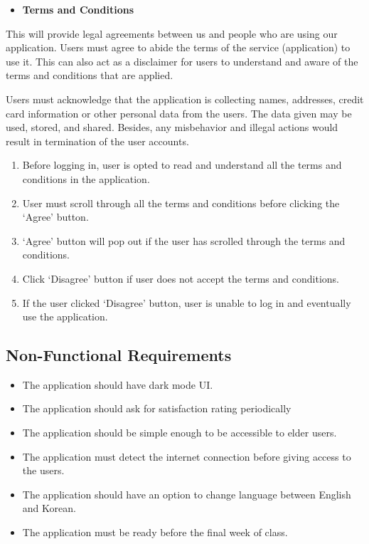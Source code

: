 \documentclass[conference]{IEEEtran}
\begin{document}
\begin{itemize}
\item \textbf{Terms and Conditions}
\end{itemize}
\par This will provide legal agreements between us and people who are using our application. Users must agree to abide the terms of the service (application) to use it. This can also act as a disclaimer for users to understand and aware of the terms and conditions that are applied.
\par Users must acknowledge that the application is collecting names, addresses, credit card information or other personal data from the users. The data given may be used, stored, and shared. Besides, any misbehavior and illegal actions would result in termination of the user accounts. 
\begin{enumerate}
\item  Before logging in, user is opted to read and understand all the terms and conditions in the application.
\item  User must scroll through all the terms and conditions before clicking the ‘Agree’ button. 
\item  ‘Agree’ button will pop out if the user has scrolled through the terms and conditions.
\item  Click ‘Disagree’ button if user does not accept the terms and conditions. 
\item  If the user clicked ‘Disagree’ button, user is unable to log in and eventually use the application.\\
\end{enumerate}

\subsection{Non-Functional Requirements}
\begin{itemize}
\item  The application should have dark mode UI.
\item  The application should ask for satisfaction rating periodically
\item  The application should be simple enough to be accessible to elder users.
\item  The application must detect the internet connection before giving access to the users.
\item  The application should have an option to change language between English and Korean.
\item  The application must be ready before the final week of class. 
\end{itemize}
\end{document}

